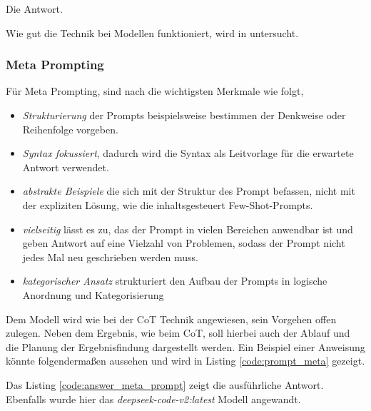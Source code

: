 

Die Antwort.



Wie gut die Technik bei Modellen funktioniert, wird in \cite{wei-2022} untersucht.


\subsubsection{Meta Prompting}
Für Meta Prompting, sind nach \cite{zhang-2023} die wichtigsten Merkmale wie folgt,

\begin{itemize}
	\item \textit{Strukturierung} der Prompts beispielsweise bestimmen der Denkweise oder Reihenfolge vorgeben.
	\item \textit{Syntax fokussiert}, dadurch wird die Syntax als Leitvorlage für die erwartete Antwort verwendet.
	\item \textit{abstrakte Beispiele} die sich mit der Struktur des Prompt befassen, nicht mit der expliziten Lösung, wie die inhaltsgesteuert Few-Shot-Prompts.
	\item \textit{vielseitig} lässt es zu, das der Prompt in vielen Bereichen anwendbar ist und geben Antwort auf eine Vielzahl von Problemen, sodass der Prompt nicht jedes Mal neu geschrieben werden muss.
	\item \textit{kategorischer Ansatz} strukturiert den Aufbau der Prompts in logische Anordnung und Kategorisierung 
\end{itemize}

Dem Modell wird wie bei der CoT Technik angewiesen, sein Vorgehen offen zulegen. Neben dem Ergebnis, wie beim CoT, soll hierbei auch der Ablauf und die Planung der Ergebnisfindung dargestellt werden. Ein Beispiel einer Anweisung könnte folgendermaßen aussehen und wird in Listing \ref{code:prompt_meta} gezeigt.



Das Listing \ref{code:answer_meta_prompt} zeigt die ausführliche Antwort. Ebenfalls wurde hier das \textit{deepseek-code-v2:latest} Modell angewandt.

